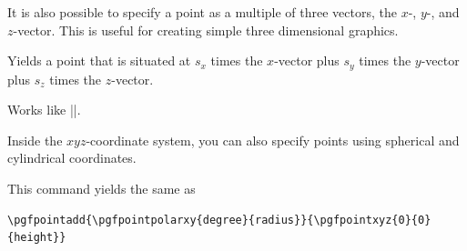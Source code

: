 It is also possible to specify a point as a multiple of three vectors, the
$x$-, $y$-, and $z$-vector. This is useful for creating simple three
dimensional graphics.

\begin{command}{\pgfpointxyz{}}
    Yields a point that is situated at $s_x$ times the $x$-vector plus $s_y$
    times the $y$-vector plus  $s_z$ times the $z$-vector.
\begin{codeexample}[]
\begin{pgfpicture}

  \pgfpathmoveto{\pgfpointorigin}
  \pgfpathmoveto{\pgfpointorigin}
  \pgfpathmoveto{\pgfpointorigin}
\end{pgfpicture}
\end{codeexample}
\end{command}

\begin{command}{\pgfsetzvec{}}
    Works like |\pgfsetxvec|.
\end{command}

Inside the $xyz$-coordinate system, you can also specify points using spherical
and cylindrical coordinates.

\begin{command}{\pgfpointcylindrical{}}
    This command yields the same as
\begin{verbatim}
\pgfpointadd{\pgfpointpolarxy{degree}{radius}}{\pgfpointxyz{0}{0}{height}}
\end{verbatim}
\begin{codeexample}[]
\end{codeexample}
\end{command}

